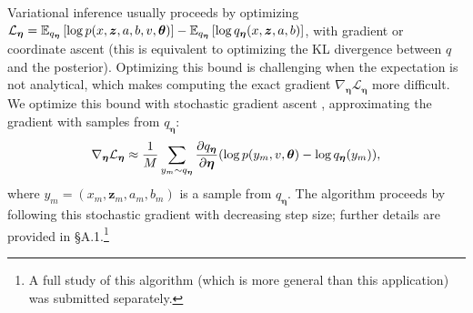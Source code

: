 Variational inference usually proceeds by optimizing $\mathcal{L}_{\bm
  \eta} = \mathbb{E}_{q_{\bm
  \eta}}\left[ \log p(x, \bm z, a, b, v, \bm \theta) \right] - \mathbb{E}_{q_{\bm \eta}}\left[ \log q_{\bm \eta}(x, \bm z, a, b) \right]$,
with gradient or coordinate ascent (this is equivalent to optimizing
the KL divergence between $q$ and the posterior).  Optimizing this
bound is challenging when the expectation is not analytical, which
makes computing the exact gradient $\nabla_{\bm \eta} \mathcal{L}_{\bm
  \eta}$ more difficult.  We optimize this bound with stochastic
gradient ascent \cite{robbins:1951,bottou:2004}, approximating the
gradient with samples from $q_{\bm \eta}$:
\begin{align}
\nabla_{\bm \eta} \mathcal{L}_{\bm \eta}
  \approx \frac{1}{M} \sum_{y_m \sim q_{\bm \eta}}
    \frac{\partial q_{\bm \eta}}{\partial \bm \eta}( \log p(y_m, v, \bm \theta) - \log q_{\bm \eta}(y_m)
    ),
    \label{equation:approx_elbo_gradient}
\end{align}
where $y_m=(x_m, \bm z_m, a_m, b_m)$ is a sample from $q_{\bm
  \eta}$. The algorithm proceeds by following this stochastic gradient
with decreasing step size; further details are provided in
\S A.1.\footnote{ A full study of this algorithm (which is more general
  than this application) was submitted separately. }


